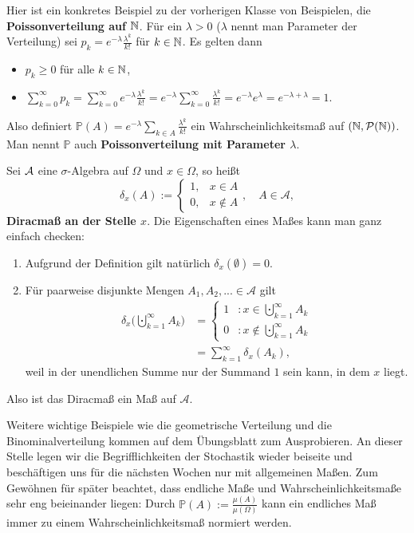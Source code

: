 \begin{beispiel}\label{Poi1} 
	Hier ist ein konkretes Beispiel zu der vorherigen Klasse von Beispielen, die \textbf{Poissonverteilung auf $\mathbb{N}$}. F\"ur ein $\lambda >0$ ($\lambda$ nennt man Parameter der Verteilung) sei
	$p_k = e^{-\lambda} \frac{\lambda^k}{k!}$ f\"ur $k\in\mathbb{N}$. Es gelten dann
	\begin{itemize}
		\item $p_k \geq 0$ f\"ur alle $k\in\mathbb{N}$,
		\item $\sum\limits_{k=0}^{\infty} p_k = \sum\limits_{k=0}^{\infty} e^{-\lambda} \frac{\lambda^k}{k!} = e^{-\lambda} \sum\limits_{k=0}^{\infty} \frac{\lambda^k}{k!} = e^{-\lambda} e^{\lambda} = e^{-\lambda + \lambda} = 1$.
	\end{itemize}
	Also definiert $\mathbb P(A)=e^{-\lambda} \sum_{k\in A} \frac{\lambda^k}{k!}$ ein Wahrscheinlichkeitsma\ss{} auf $(\mathbb{N}, \mathcal P(\mathbb{N}))$. Man nennt $\mathbb P$ auch \textbf{Poissonverteilung mit Parameter $\lambda$}.
\end{beispiel}
\begin{beispiel} 
	Sei $\mathcal{A}$ eine $\sigma$-Algebra auf $\Omega$ und $x \in \Omega$, so heißt $$\delta_x(A):=\begin{cases}
	1,&x \in A\\
	0,&x \notin A
	\end{cases},\quad A\in \mathcal A,$$ \textbf{Diracmaß an der Stelle $x$}. Die Eigenschaften eines Ma\ss es kann man ganz einfach checken:
	\begin{enumerate}[label=(\roman*)]
		\item Aufgrund der Definition gilt nat\"urlich $\delta_x(\emptyset) = 0$.
		\item F\"ur paarweise disjunkte Mengen $A_1 ,A_2, ... \in \mathcal A$ gilt 
		\begin{align*}
		\delta_x\Big(\bigcupdot\limits_{k=1}^{\infty} A_k\Big) &= \begin{cases}
		1&:x \in \bigcupdot\limits_{k=1}^{\infty} A_k\\
		0&:x \notin \bigcupdot\limits_{k=1}^{\infty} A_k
		\end{cases}\\& = \sum\limits_{k=1}^{\infty} \delta_x(A_k),
		\end{align*}
		 weil in der unendlichen Summe nur der Summand $1$ sein kann, in dem $x$ liegt.
	\end{enumerate}
	Also ist das Diracma\ss{} ein Ma\ss{} auf $\mathcal A$.
\end{beispiel}
Weitere wichtige Beispiele wie die geometrische Verteilung und die Binominalverteilung kommen auf dem \"Ubungsblatt zum Ausprobieren. An dieser Stelle legen wir die Begrifflichkeiten der Stochastik wieder beiseite und besch\"aftigen uns f\"ur die n\"achsten Wochen nur mit allgemeinen Ma\ss en. Zum Gew\"ohnen f\"ur sp\"ater beachtet, dass endliche Ma\ss e und Wahrscheinlichkeitsma\ss e sehr eng beieinander liegen: Durch $\mathbb P(A):=\frac{\mu(A)}{\mu(\Omega)}$ kann ein endliches Ma\ss{} immer zu einem Wahrscheinlichkeitsma\ss{} \glqq normiert\grqq{} werden.\smallskip

